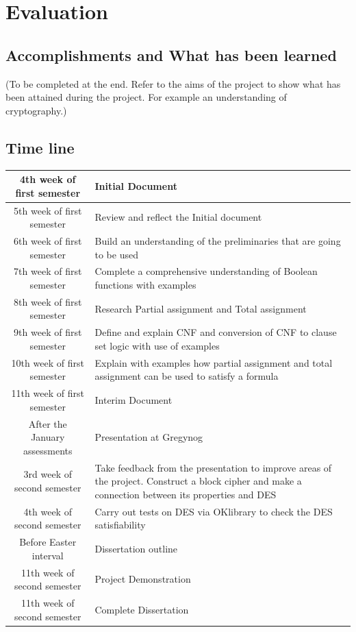 \documentclass[11pt,a4paper]{report}
\begin{document}
\chapter{Evaluation}
\label{cha:Eval}

\section{Accomplishments and What has been learned}
(To be completed at the end. Refer to the aims of the project to show what has been attained during the project. For example an understanding of cryptography.)

\section{Time line}
\begin{center}
\begin{tabular}{|c|p{5cm}|}
\hline
4th week of first semester & Initial Document \\\hline
5th week of first semester & Review and reflect the Initial document\\ \hline
6th week of first semester & Build an understanding of the preliminaries that are going to be used\\ \hline
7th week of first semester & Complete a comprehensive understanding of Boolean functions with examples\\ \hline
8th week of first semester & Research Partial assignment and Total assignment \\ \hline
9th week of first semester & Define and explain CNF and conversion of CNF to clause set logic with use of examples \\ \hline
10th week of first semester & Explain with examples how partial assignment and total assignment can be used to satisfy a formula\\\hline
11th week of first semester & Interim Document\\ \hline
After the January assessments & Presentation at Gregynog\\ \hline
3rd week of second semester & Take feedback from the presentation to improve areas of the project. Construct a block cipher and make a connection between its properties and DES\\ \hline
4th week of second semester & Carry out tests on DES via OKlibrary to check the DES satisfiability\\ \hline 
Before Easter interval & Dissertation outline\\ \hline
11th week of second semester & Project Demonstration\\ \hline
11th week of second semester & Complete Dissertation\\ \hline
\hline
\end{tabular} 
\end{center}
\end{document}
